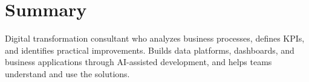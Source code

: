 \section{Summary}

Digital transformation consultant who analyzes business processes, defines KPIs, and
identifies practical improvements. Builds data platforms, dashboards, and business
applications through AI-assisted development, and helps teams understand and use the solutions.
